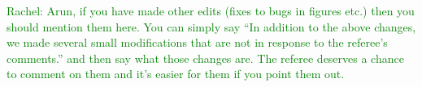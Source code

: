\documentclass[english]{letter}
\newcommand{\rachel}[1]{\textrm{\textcolor{green}{Rachel: #1}}}
\begin{document}
\rachel{Arun, if you have made other edits (fixes to bugs in figures etc.) then you should mention
  them here.  You can simply say ``In addition to the above changes, we made several small
  modifications that are not in response to the referee's comments.'' and then say what those
  changes are.  The referee deserves a chance to comment on them and it's easier for them if you
  point them out.}
\end{document}
